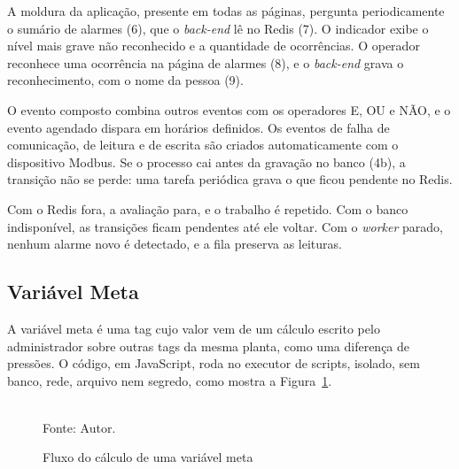 \par A moldura da aplicação, presente em todas as páginas, pergunta periodicamente o sumário de alarmes (6), que o \emph{back-end} lê no Redis (7). O indicador exibe o nível mais grave não reconhecido e a quantidade de ocorrências. O operador reconhece uma ocorrência na página de alarmes (8), e o \emph{back-end} grava o reconhecimento, com o nome da pessoa (9).

\par O evento composto combina outros eventos com os operadores E, OU e NÃO, e o evento agendado dispara em horários definidos. Os eventos de falha de comunicação, de leitura e de escrita são criados automaticamente com o dispositivo Modbus. Se o processo cai antes da gravação no banco (4b), a transição não se perde: uma tarefa periódica grava o que ficou pendente no Redis.

\par Com o Redis fora, a avaliação para, e o trabalho é repetido. Com o banco indisponível, as transições ficam pendentes até ele voltar. Com o \emph{worker} parado, nenhum alarme novo é detectado, e a fila preserva as leituras.

\subsection{Variável Meta}

\par A variável meta é uma tag cujo valor vem de um cálculo escrito pelo administrador sobre outras tags da mesma planta, como uma diferença de pressões. O código, em JavaScript, roda no executor de scripts, isolado, sem banco, rede, arquivo nem segredo, como mostra a Figura~\ref{fig:fx_meta}.

\begin{figure}[H]
    \centering
    \caption{Fluxo do cálculo de uma variável meta}
    \label{fig:fx_meta}
    \vspace{0.4cm}
    \vspace{0.2cm} \\
    Fonte: Autor.
\end{figure}

